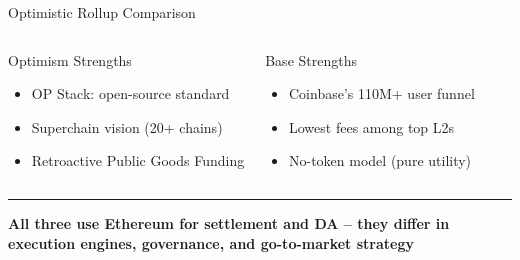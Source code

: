 \documentclass[8pt,aspectratio=169]{beamer}
\newcommand{\bottomnote}[1]{\vfill\vspace{-2mm}\textcolor{mllavender2}{\rule{\textwidth}{0.4pt}}\vspace{1mm}\footnotesize\textbf{#1}}
\begin{document}
\begin{frame}{Optimistic Rollup Comparison}
\begin{columns}[T]
\begin{block}{\footnotesize Optimism Strengths}
\scriptsize
\begin{itemize}
  \item OP Stack: open-source standard
  \item Superchain vision (20+ chains)
  \item Retroactive Public Goods Funding
\end{itemize}
\end{block}
\begin{block}{\footnotesize Base Strengths}
\scriptsize
\begin{itemize}
  \item Coinbase's 110M+ user funnel
  \item Lowest fees among top L2s
  \item No-token model (pure utility)
\end{itemize}
\end{block}
\end{columns}
\bottomnote{All three use Ethereum for settlement and DA -- they differ in execution engines, governance, and go-to-market strategy}
\end{frame}
\end{document}
